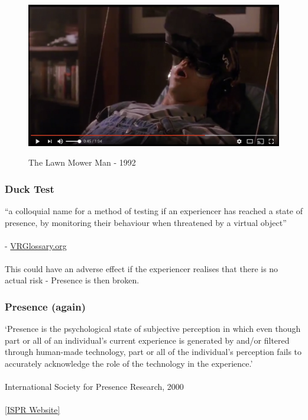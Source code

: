 \begin{frame}
	\begin{figure}
		\href{https://www.youtube.com/watch?v=zTrgHXNAs24}{ \includegraphics[scale=.3]{assets/mower}  }
		\caption{The Lawn Mower Man - 1992}
	\end{figure}
\end{frame}

\begin{frame}
	\frametitle{Duck Test}
	``a colloquial name for a method of testing if an experiencer has reached a state of presence, by monitoring their behaviour when threatened by a virtual object'' \\~\\
	- \href{http://www.vrglossary.org/glossary/duck-test/}{VRGlossary.org} \\~\\
	This could have an adverse effect if the experiencer realises that there is no actual risk - Presence is then broken.
		
\end{frame}


\begin{frame}
	\frametitle{Presence (again)}
	
	`Presence is the psychological state of subjective perception in which even though part or all of an individual's current experience is generated by and/or filtered through human-made technology, part or all of the individual's perception fails to accurately acknowledge the role of the technology in the experience.' \\~\\
	
	International Society for Presence Research, 2000
	\\~\\
	\href{http://ispr.info}{[ISPR Website]}	
	
\end{frame}


